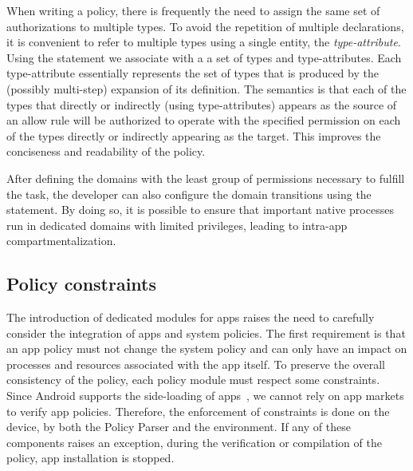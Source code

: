 When writing a policy, there is frequently the need to assign the same
set of authorizations to multiple types.  To avoid the repetition of
multiple \allow declarations, it is convenient to refer to multiple
types using a single entity, the {\em type-attribute}.  Using the
\typeattributeset statement we associate with a \typeattribute a set
of types and type-attributes.  Each type-attribute essentially
represents the set of types that is produced by the (possibly
multi-step) expansion of its definition.  The semantics is that each
of the types that directly or indirectly (using type-attributes)
appears as the source of an allow rule will be authorized to operate
with the specified permission on each of the types directly or
indirectly appearing as the target.  This improves the conciseness and
readability of the policy.

After defining the domains with the least group of permissions
necessary to fulfill the task, the developer can also configure the
domain transitions using the \typetransition statement.
By doing so, it is possible to ensure that important native processes run
in dedicated domains with limited privileges, leading to intra-app
compartmentalization.


\subsection{Policy constraints}\label{subsect:seapp_constraints}

The introduction of dedicated modules for apps raises the need to
carefully consider the integration of apps and system policies.  The
first requirement is that an app policy must not change the system
policy and can only have an impact on processes and resources
associated with the app itself.  To preserve the overall consistency
of the \sel policy, each policy module must respect some constraints.
Since Android supports the side-loading of
apps~\cite{seapp_adb_install}, we cannot rely on app markets to verify
app policies.  Therefore, the enforcement of constraints is done on
the device, by both the \pap Policy Parser and the \sel environment.
If any of these components raises an exception, during the
verification or compilation of the policy, app installation is
stopped.

